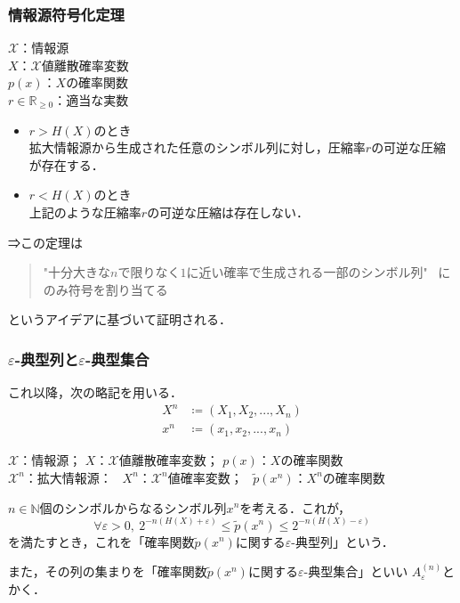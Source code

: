 \documentclass{classes/myslide}
\begin{document}
\begin{frame}\frametitle{情報源符号化定理}
  \begin{theorem}[情報源符号化定理]
    $\mathcal{X}$：情報源 \\
    $X$：$\mathcal{X}$値離散確率変数 \\
    $p(x)$：$X$の確率関数 \\
    $r \in \mathbb{R}_{\geq 0}$：適当な実数 \\
    \begin{itemize}
      \item $r > H(X)$のとき \\ 拡大情報源から生成された任意のシンボル列に対し，圧縮率$r$の可逆な圧縮が存在する．
      \item $r < H(X)$のとき \\ 上記のような圧縮率$r$の可逆な圧縮は存在しない．
    \end{itemize}
  \end{theorem}
  ⇒この定理は 
  \begin{quote}
    "十分大きな$n$で限りなく$1$に近い確率で生成される一部のシンボル列" \ にのみ符号を割り当てる
  \end{quote}
  というアイデアに基づいて証明される．
\end{frame}

\begin{frame}\frametitle{$\varepsilon$-典型列と$\varepsilon$-典型集合}
  これ以降，次の略記を用いる．
  \begin{align*}
    X^n &\coloneq  (X_1, X_2, ..., X_n) \\
    x^n &\coloneq (x_1, x_2, ..., x_n )
  \end{align*}
  \begin{definition}
    $\mathcal{X}$：情報源； \quad  $X$：$\mathcal{X}$値離散確率変数； \quad $p(x)$：$X$の確率関数 \\
    $\mathcal{X}^n$：拡大情報源： \  $X^n$：$\mathcal{X}^n$値確率変数； \  $\tilde{p}(x^n)$：$X^n$の確率関数

    $n \in \mathbb{N}$個のシンボルからなるシンボル列$x^n$を考える．これが，
    \[
      \forall \varepsilon > 0, \  2^{-n(H(X) + \varepsilon)} \leq \tilde{p}(x^n) \leq  2^{-n(H(X) - \varepsilon)} 
    \]
    を満たすとき，これを「確率関数$\tilde{p}(x^n)$に関する$\varepsilon$-典型列」という．

    また，その列の集まりを「確率関数$\tilde{p}(x^n)$に関する$\varepsilon$-典型集合」といい
    $A_{\varepsilon}^{(n)}$とかく．
  \end{definition}
\end{frame}
\end{document}
